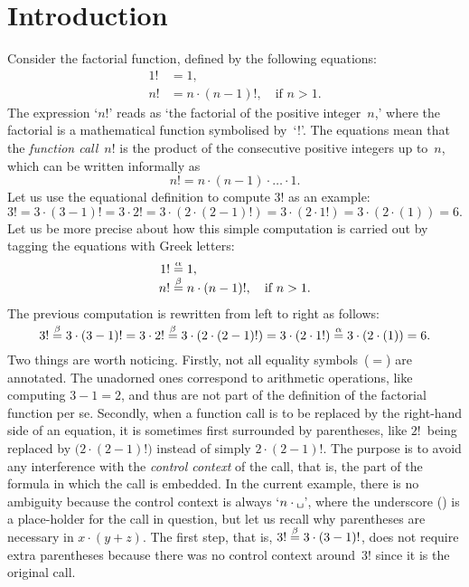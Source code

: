 
\chapter{Introduction}

Consider the factorial function, defined by the following equations:
\begin{align*}
  1! &= 1,\\
  n! &= n \cdot (n-1)!,\quad \text{if \(n > 1\)}.
\end{align*}
The expression `\(n!\)' reads as `the factorial of the positive
integer~\(n\),' where the factorial is a mathematical function
symbolised by~`!'. The equations mean that the \emph{function
  call}~\(n!\) is the product of the consecutive positive integers up
to~\(n\), which can be written informally as
\begin{equation*}
n! = n \cdot (n-1) \cdot \ldots \cdot 1.
\end{equation*}
Let us use the equational definition to compute \(3!\) as an example:
\begin{equation*}
3! = 3 \cdot (3-1)! = 3 \cdot 2! = 3 \cdot (2 \cdot (2-1)!) = 3
\cdot (2 \cdot 1!) = 3 \cdot (2 \cdot (1)) = 6.
\end{equation*}
Let us be more precise about how this simple computation is carried
out by tagging the equations with Greek letters:
\begin{align*}
  1! &\mathrel{\smash{\stackrel{\alpha}{=}}} 1,\\
  n! &\mathrel{\smash{\stackrel{\beta}{=}}} n \cdot (n-1)!, \quad \text{if \(n > 1\)}.
\end{align*}
The previous computation is rewritten from left to right as follows:
\begin{equation*}
3! \mathrel{\smash{\stackrel{\beta}{=}}} 3 \cdot (3-1)! = 3 \cdot 2! \mathrel{\smash{\stackrel{\beta}{=}}} 3 \cdot (2 \cdot
(2-1)!) = 3 \cdot (2 \cdot 1!) \mathrel{\smash{\stackrel{\alpha}{=}}} 3 \cdot (2 \cdot (1)) = 6.
\end{equation*}
Two things are worth noticing. Firstly, not all equality
symbols~(\(=\)) are annotated. The unadorned ones correspond to
arithmetic operations, like computing \(3-1 = 2\), and thus are not
part of the definition of the factorial function per se. Secondly,
when a function call is to be replaced by the right\hyp{}hand side of
an equation, it is sometimes first surrounded by parentheses, like
\(2!\)~being replaced by \(\textbf{(}2 \cdot (2-1)!\textbf{)}\)
instead of simply \(2 \cdot (2-1)!\). The purpose is to avoid any
interference with the \emph{control context} of the call, that is, the
part of the formula in which the call is embedded. In the current
example, there is no ambiguity because the control context is always
`\(n \cdot \erlcode{\textvisiblespace}\)', where the underscore
(\erlcode{\textvisiblespace}) is a place\hyp{}holder for the call in
question, but let us recall why parentheses are necessary in \(x \cdot
(y + z)\). The first step, that is, \(3!  \mathrel{\smash{\stackrel{\beta}{=}}} 3 \cdot
(3-1)!\), does not require extra parentheses because there was no
control context around~\(3!\) since it is the original call.

